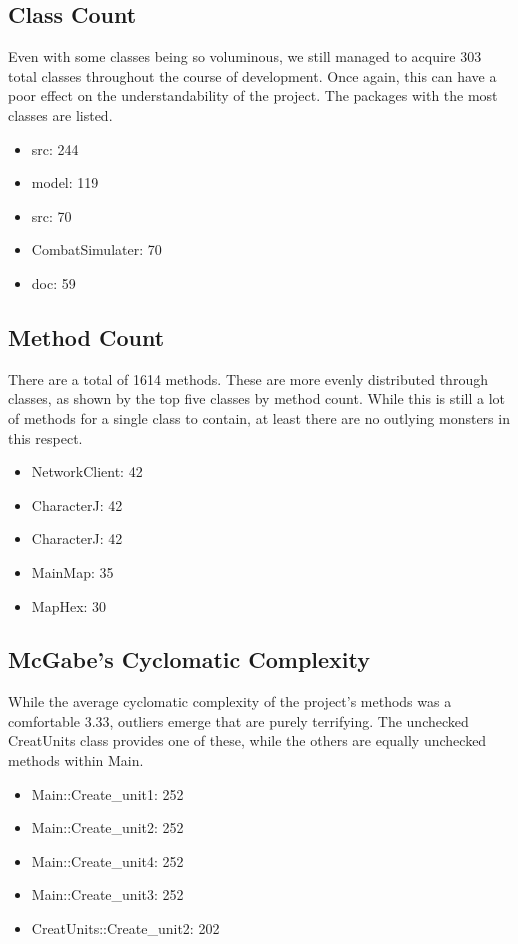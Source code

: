 \documentclass[12pt,a4paper,titlepage]{article}
\begin{document}
\subsection{Class Count}
Even with some classes being so voluminous, we still managed to acquire 303 total classes 
throughout the course of development. Once again, this can have a poor effect on the 
understandability of the project. The packages with the most classes are listed.

\begin{itemize}
\item src: 244
\item model: 119
\item src: 70
\item CombatSimulater: 70
\item doc: 59
\end{itemize}

\subsection{Method Count}
There are a total of 1614 methods. These are more evenly distributed through classes, as shown 
by the top five classes by method count. While this is still a lot of methods for a single 
class to contain, at least there are no outlying monsters in this respect.

\begin{itemize}
\item NetworkClient: 42
\item CharacterJ: 42
\item CharacterJ: 42
\item MainMap: 35
\item MapHex: 30
\end{itemize}

\subsection{McGabe's Cyclomatic Complexity}
While the average cyclomatic complexity of the project's methods was a comfortable 3.33, 
outliers emerge that are purely terrifying. The unchecked CreatUnits class provides one of 
these, while the others are equally unchecked methods within Main.

\begin{itemize}
\item Main::Create\_unit1: 252
\item Main::Create\_unit2: 252
\item Main::Create\_unit4: 252
\item Main::Create\_unit3: 252
\item CreatUnits::Create\_unit2: 202
\end{itemize}
\end{document}
